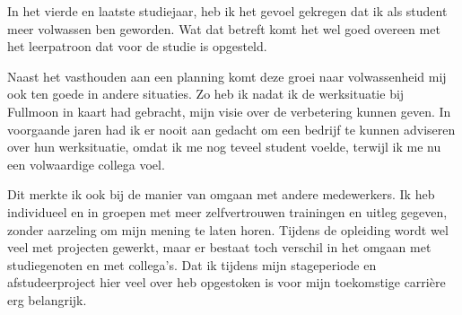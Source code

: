 In het vierde en laatste studiejaar, heb ik het gevoel gekregen dat ik als student meer volwassen ben geworden. Wat dat betreft komt het wel goed overeen met het leerpatroon dat voor de studie is opgesteld.

Naast het vasthouden aan een planning komt deze groei naar volwassenheid mij ook ten goede in andere situaties. Zo heb ik nadat ik de werksituatie bij Fullmoon in kaart had gebracht, mijn visie over de verbetering kunnen geven. In voorgaande jaren had ik er nooit aan gedacht om een bedrijf te kunnen adviseren over hun werksituatie, omdat ik me nog teveel student voelde, terwijl ik me nu een volwaardige collega voel. 

Dit merkte ik ook bij de manier van omgaan met andere medewerkers. Ik heb individueel en in groepen met meer zelfvertrouwen trainingen en uitleg gegeven, zonder aarzeling om mijn mening te laten horen. Tijdens de opleiding wordt wel veel met projecten gewerkt, maar er bestaat toch verschil in het omgaan met studiegenoten en met collega's. Dat ik tijdens mijn stageperiode en afstudeerproject hier veel over heb opgestoken is voor mijn toekomstige carrière erg belangrijk.
